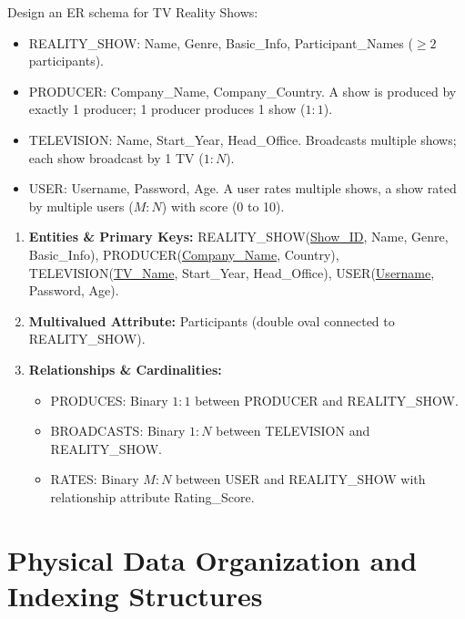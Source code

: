 \documentclass[11pt,a4paper]{article}
\newcommand{\ic}[1]{\mbox{\colorbox{AnthCodeBG}{\footnotesize\ttfamily\textcolor{AnthBlue}{#1}}}}
\newenvironment{Problem}[1][Problem Scenario]{\begin{tcolorbox}[problembox, title=#1]}{\end{tcolorbox}}
\newenvironment{Solution}[1][Step-by-Step Solution]{\begin{tcolorbox}[solbox, title=#1]}{\end{tcolorbox}}
\begin{document}
\begin{Problem}[Case Study 2: Television Reality Show Database (KTU Scenario Problem)]
Design an ER schema for TV Reality Shows:
\begin{itemize}
  \item \ic{REALITY\_SHOW}: Name, Genre, Basic\_Info, Participant\_Names ($\ge 2$ participants).
  \item \ic{PRODUCER}: Company\_Name, Company\_Country. A show is produced by exactly 1 producer; 1 producer produces 1 show ($1:1$).
  \item \ic{TELEVISION}: Name, Start\_Year, Head\_Office. Broadcasts multiple shows; each show broadcast by 1 TV ($1:N$).
  \item \ic{USER}: Username, Password, Age. A user rates multiple shows, a show rated by multiple users ($M:N$) with score (0 to 10).
\end{itemize}
\end{Problem}

\begin{Solution}
\begin{enumerate}
  \item \textbf{Entities \& Primary Keys:} \ic{REALITY\_SHOW}(\underline{Show\_ID}, Name, Genre, Basic\_Info), \ic{PRODUCER}(\underline{Company\_Name}, Country), \ic{TELEVISION}(\underline{TV\_Name}, Start\_Year, Head\_Office), \ic{USER}(\underline{Username}, Password, Age).
  \item \textbf{Multivalued Attribute:} \ic{Participants} (double oval connected to \ic{REALITY\_SHOW}).
  \item \textbf{Relationships \& Cardinalities:}
    \begin{itemize}
      \item \ic{PRODUCES}: Binary $1:1$ between \ic{PRODUCER} and \ic{REALITY\_SHOW}.
      \item \ic{BROADCASTS}: Binary $1:N$ between \ic{TELEVISION} and \ic{REALITY\_SHOW}.
      \item \ic{RATES}: Binary $M:N$ between \ic{USER} and \ic{REALITY\_SHOW} with relationship attribute \ic{Rating\_Score}.
    \end{itemize}
\end{enumerate}
\end{Solution}

\clearpage
\section{Physical Data Organization and Indexing Structures}
\end{document}
